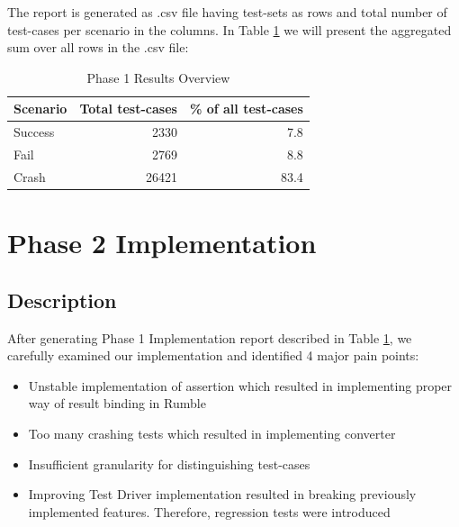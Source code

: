 The report is generated as .csv file having test-sets as rows and total number of test-cases per scenario in the columns. In Table \ref{tab:Phase1_ResultTable} we will present the aggregated sum over all rows in the .csv file:
\begin{table}[h!]
	\centering
	\begin{tabular}{|l|r|r|}
		\hline
		\multicolumn{1}{|c|}{Scenario} & \multicolumn{1}{c|}{Total test-cases} & \multicolumn{1}{c|}{\% of all test-cases} \\ \hline
		Success                        & 2330                                  & 7.8                                       \\ \hline
		Fail                           & 2769                                  & 8.8                                       \\ \hline
		Crash                          & 26421                                 & 83.4                                      \\ \hline
	\end{tabular}
 	\caption{Phase 1 Results Overview}
 	\label{tab:Phase1_ResultTable}
\end{table}

\section{Phase 2 Implementation}
\subsection{Description}
\label{Phase2_Description}
After generating Phase 1 Implementation report described in Table \ref{tab:Phase1_ResultTable}, we carefully examined our implementation and identified 4 major pain points:
\begin{itemize}
	\item Unstable implementation of assertion which resulted in implementing proper way of result binding in Rumble
	\item Too many crashing tests which resulted in implementing converter
	\item Insufficient granularity for distinguishing test-cases
	\item Improving Test Driver implementation resulted in breaking previously implemented features. Therefore, regression tests were introduced
\end{itemize}

